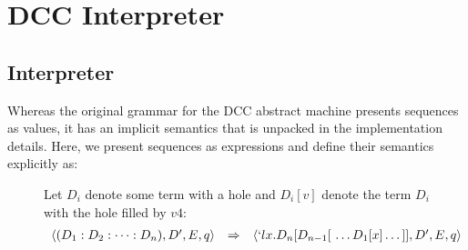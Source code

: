 \chapter{DCC Interpreter}

\section{Interpreter}

Whereas the original grammar for the DCC abstract machine presents sequences as values, it has an implicit semantics that is unpacked in the implementation details. Here, we present sequences as expressions and define their semantics explicitly as:

\begin{figure}[!h]
\begin{definition}
\item Let $D_i$ denote some term with a hole and $D_i[v]$ denote the term $D_i$ with the hole filled by $v4$:
\[
\begin{array}{rclr}
  \langle 
    (D_1:D_2:\dots:D_n) ,
    D^\prime,
    E,
    q
  \rangle 
    &\Rightarrow&
  \langle 
    `lx.D_n[D_{n-1}[\ \dots D_1[x]\dots ]],
    D^\prime,
    E,
    q
  \rangle 
\end{array}
\]
\end{definition}

\end{figure}
  

